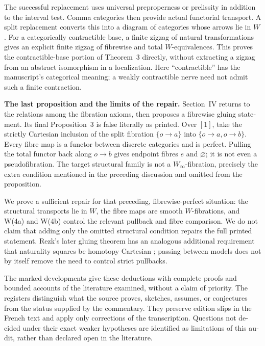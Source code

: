 \begin{otherlanguage}{english}
\begin{otherlanguage}{english}
The successful replacement uses universal preproperness or prelissity in addition to the interval test. Comma categories then provide actual functorial transport. A split replacement converts this into a diagram of categories whose arrows lie in \(W\). For a categorically contractible base, a finite zigzag of natural transformations gives an explicit finite zigzag of fibrewise and total \(W\)-equivalences. This proves the contractible-base portion of Theorem~3 directly, without extracting a zigzag from an abstract isomorphism in a localization. Here “contractible” has the manuscript's categorical meaning; a weakly contractible nerve need not admit such a finite contraction.

\medskip
\noindent\textbf{The last proposition and the limits of the repair.}
Section~IV returns to the relations among the fibration axioms, then proposes a fibrewise gluing statement. Its final Proposition~3 is false literally as printed. Over \([1]\), take the strictly Cartesian inclusion of the split fibration \(\{o\to a\}\) into \(\{o\to a,o\to b\}\). Every fibre map is a functor between discrete categories and is perfect. Pulling the total functor back along \(o\to b\) gives endpoint fibres \(e\) and \(\varnothing\); it is not even a pseudofibration. The target structural family is not a \(W_\infty\)-fibration, precisely the extra condition mentioned in the preceding discussion and omitted from the proposition.

We prove a sufficient repair for that preceding, fibrewise-perfect situation: the structural transports lie in \(W\), the fibre maps are smooth \(W\)-fibrations, and W(4a) and W(4b) control the relevant pullback and fibre comparison. We do not claim that adding only the omitted structural condition repairs the full printed statement. Rezk's later gluing theorem has an analogous additional requirement that naturality squares be homotopy Cartesian \citep[Theorem~7.1]{Rezk1998Sharp}; passing between models does not by itself remove the need to control strict pullbacks.

The marked developments give these deductions with complete proofs and bounded accounts of the literature examined, without a claim of priority. The registers distinguish what the source proves, sketches, assumes, or conjectures from the status supplied by the commentary. They preserve edition slips in the French text and apply only corrections of the transcription. Questions not decided under their exact weaker hypotheses are identified as limitations of this audit, rather than declared open in the literature.

\end{otherlanguage}
\end{otherlanguage}
\dgrchunkend
